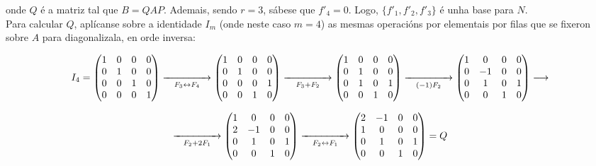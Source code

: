 \documentclass[twoside]{report}
\theoremstyle{mystyle}
\begin{document}
\vspace{3mm}

\noindent onde $Q$ é a matriz tal que $B = QAP$. Ademais, sendo $r = 3$, sábese que $f'_{4} = 0$. Logo, $\{f'_{1}, f'_{2}, f'_{3}\}$ é unha base para $N$.\\

\noindent Para calcular $Q$, aplícanse sobre a identidade $I_{m}$ (onde neste caso $m = 4$) as mesmas operacións por elementais por filas que se fixeron sobre $A$ para diagonalizala, en orde inversa:

\[
I_{4} = 
\begin{pmatrix}
1 & 0 & 0 & 0\\
0 & 1 & 0 & 0\\
0 & 0 & 1 & 0\\
0 & 0 & 0 & 1
\end{pmatrix}
\underset{F_{3} \leftrightarrow F_{4}}{\xrightarrow{\hspace{15mm}}}
\begin{pmatrix}
1 & 0 & 0 & 0\\
0 & 1 & 0 & 0\\
0 & 0 & 0 & 1\\
0 & 0 & 1 & 0
\end{pmatrix}
\underset{F_{3} + F_{2}}{\xrightarrow{\hspace{15mm}}}
\begin{pmatrix}
1 & 0 & 0 & 0\\
0 & 1 & 0 & 0\\
0 & 1 & 0 & 1\\
0 & 0 & 1 & 0
\end{pmatrix}
\underset{(-1)F_{2}}{\xrightarrow{\hspace{15mm}}}
\begin{pmatrix}
1 & 0 & 0 & 0\\
0 & -1 & 0 & 0\\
0 & 1 & 0 & 1\\
0 & 0 & 1 & 0
\end{pmatrix}
\longrightarrow
\]

\vspace{3mm}

\[
\underset{F_{2} + 2F_{1}}{\xrightarrow{\hspace{15mm}}}
\begin{pmatrix}
1 & 0 & 0 & 0\\
2 & -1 & 0 & 0\\
0 & 1 & 0 & 1\\
0 & 0 & 1 & 0
\end{pmatrix}
\underset{F_{2} \leftrightarrow F_{1}}{\xrightarrow{\hspace{15mm}}}
\begin{pmatrix}
2 & -1 & 0 & 0\\
1 & 0 & 0 & 0\\
0 & 1 & 0 & 1\\
0 & 0 & 1 & 0
\end{pmatrix}
= Q
\]
\end{document}
